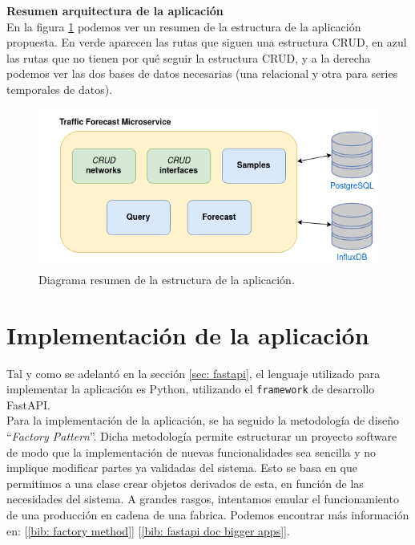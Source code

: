 \documentclass[a4paper, oneside, 12pt]{book}
\begin{document}
	\noindent \textbf{\large Resumen arquitectura de la aplicación} \\
	
	\noindent En la figura \ref{img: app schema} podemos ver un resumen de la estructura de la aplicación propuesta. En verde aparecen las rutas que siguen una estructura CRUD, en azul las rutas que no tienen por qué seguir la estructura CRUD, y a la derecha podemos ver las dos bases de datos necesarias (una relacional y otra para series temporales de datos).
	
	\begin{figure}[h!]
		\includegraphics[width=1.1\textwidth, center]{diag/traffic_forecast_schema.png}
		\caption{Diagrama resumen de la estructura de la aplicación.}
		\label{img: app schema}
	\end{figure}

	\pagebreak
	
	\section{Implementación de la aplicación}
	
	\noindent Tal y como se adelantó en la sección \ref{sec: fastapi}, el lenguaje utilizado para implementar la aplicación es Python, utilizando el \texttt{framework} de desarrollo FastAPI. \\
	
	\noindent Para la implementación de la aplicación, se ha seguido la metodología de diseño ``\textit{Factory Pattern}''. Dicha metodología permite estructurar un proyecto software de modo que la implementación de nuevas funcionalidades sea sencilla y no implique modificar partes ya validadas del sistema. Esto se basa en que permitimos a una clase crear objetos derivados de esta, en función de las necesidades del sistema. A grandes rasgos, intentamos emular el funcionamiento de una producción en cadena de una fabrica. Podemos encontrar más información en: [\ref{bib: factory method}] [\ref{bib: fastapi doc bigger apps}]. \\
	
\end{document}
